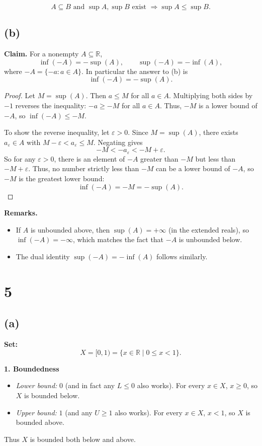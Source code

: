 \documentclass[12pt,a4paper]{article}
\theoremstyle{definition}
\theoremstyle{remark}
\begin{document}
\[
\boxed{\ A\subseteq B \text{ and } \sup A,\sup B \text{ exist } \Longrightarrow \sup A \le \sup B.\ }
\]

\subsection*{(b)}

\textbf{Claim.} For a nonempty \(A\subseteq \mathbb{R}\),
\[
\inf(-A) = -\sup(A), \qquad \sup(-A)= -\inf(A),
\]
where \(-A=\{-a: a\in A\}\). In particular the answer to (b) is
\[
\boxed{\inf(-A)= -\sup(A)}.
\]

\begin{proof}
Let \(M=\sup(A)\). Then \(a\le M\) for all \(a\in A\). Multiplying both sides by \(-1\) reverses the inequality: \(-a \ge -M\) for all \(a\in A\). Thus, \(-M\) is a lower bound of \(-A\), so \(\inf(-A)\le -M\).

To show the reverse inequality, let \(\varepsilon>0\). Since \(M=\sup(A)\), there exists \(a_\varepsilon\in A\) with \(M-\varepsilon < a_\varepsilon \le M\). Negating gives
\[
-M < -a_\varepsilon < -M + \varepsilon.
\]
So for any \(\varepsilon>0\), there is an element of \(-A\) greater than \(-M\) but less than \(-M+\varepsilon\). Thus, no number strictly less than \(-M\) can be a lower bound of \(-A\), so \(-M\) is the greatest lower bound:
\[
\inf(-A) = -M = -\sup(A).
\]
\end{proof}

\textbf{Remarks.}
\begin{itemize}
    \item If \(A\) is unbounded above, then \(\sup(A)=+\infty\) (in the extended reals), so \(\inf(-A) = -\infty\), which matches the fact that \(-A\) is unbounded below.
    \item The dual identity \(\sup(-A) = -\inf(A)\) follows similarly.
\end{itemize}


\section*{5}
\subsection*{(a)}
\textbf{Set:}
\[
X = [0,1) = \{x\in\mathbb{R}\mid 0\le x < 1\}.
\]

\textbf{1. Boundedness}

\begin{itemize}
    \item \emph{Lower bound:} $0$ (and in fact any $L\le 0$ also works). For every $x\in X$, $x\ge 0$, so $X$ is bounded below.
    \item \emph{Upper bound:} $1$ (and any $U\ge 1$ also works). For every $x\in X$, $x<1$, so $X$ is bounded above.
\end{itemize}
Thus $X$ is bounded both below and above.
\end{document}
